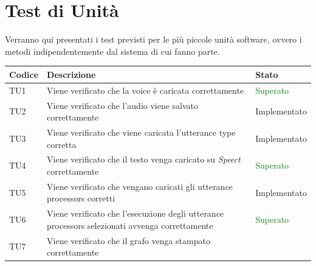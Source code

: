 \documentclass[openany,12pt,a4paper]{report}
\begin{document}
\section{Test di Unità}

Verranno qui presentati i test previsti per le più piccole unità software, ovvero i metodi indipendentemente dal sistema di cui fanno parte.

\setlength\LTleft{6mm}
\begin{longtable}{| p{2.5cm} |p{8cm} | p{2.5cm} |}
	\hline
	\textbf{Codice} & \textbf{Descrizione} & \textbf{Stato}\\
	\hline
	\endhead
	\newline TU1&
	\newline Viene verificato che la voice è caricata correttamente&
	\newline \textcolor{green}{Superato}
	\\[1em]
	\hline
	\newline TU2&
	\newline Viene verificato che l'audio viene salvato correttamente&
	\newline Implementato
	\\[1em]
	\hline
	\newline TU3&
	\newline Viene verificato che viene caricata l'utterance type corretta&
	\newline Implementato
	\\[1em]
	\hline
	\newline TU4&
	\newline Viene verificato che il testo venga caricato su \textit{Speect} correttamente&
	\newline \textcolor{green}{Superato}
	\\[1em]
	\hline
	\newline TU5&
	\newline Viene verificato che vengano caricati gli utterance processors corretti&
	\newline Implementato
	\\[1em]
	\hline
	\newline TU6&
	\newline Viene verificato che l'esecuzione degli utterance processors selezionati avvenga correttamente&
	\newline \textcolor{green}{Superato}
	\\[1em]
	\hline
	\newline TU7&
	\newline Viene verificato che il grafo venga stampato correttamente&

\end{longtable}
\end{document}

